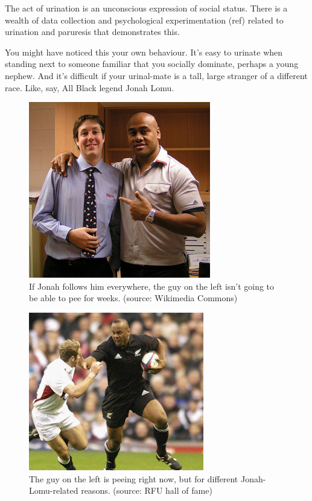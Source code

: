 The act of urination is an unconscious expression of social status. There is a wealth of data collection and psychological experimentation (ref) related to urination and paruresis that demonstrates this.

You might have noticed this your own behaviour. It's easy to urinate when standing next to someone familiar that you socially dominate, perhaps a young nephew. And it's difficult if your urinal-mate is a tall, large stranger of a different race. Like, say, All Black legend Jonah Lomu.

\begin{figure}
  \begin{center}
    \includegraphics{content/assets/shy-bladder--1}
  \end{center}
  \caption{If Jonah follows him everywhere, the guy on the left isn't going to be able to pee for weeks. (source: Wikimedia Commons)}
\end{figure}

\begin{figure}
  \begin{center}
    \includegraphics{content/assets/shy-bladder--2}
  \end{center}
  \caption{The guy on the left is peeing right now, but for different Jonah-Lomu-related reasons. (source: RFU hall of fame)}
\end{figure}

